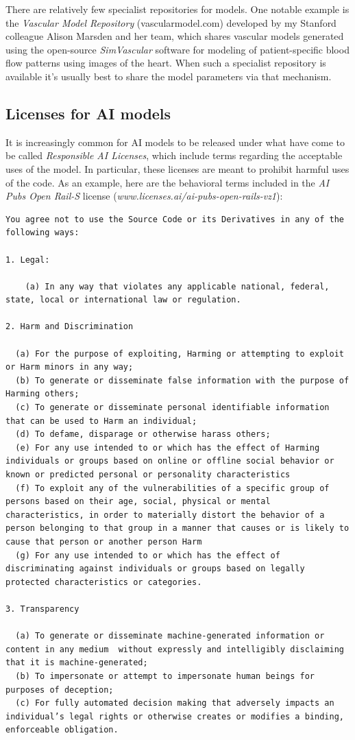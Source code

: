 There are relatively few specialist repositories for models. One notable example is the \textit{Vascular Model Repository} (vascularmodel.com) developed by my Stanford colleague Alison Marsden and her team, which shares vascular models generated using the open-source \textit{SimVascular} software for modeling of patient-specific blood flow patterns using images of the heart. When such a specialist repository is available it's usually best to share the model parameters via that mechanism.

\subsection{Licenses for AI models}

It is increasingly common for AI models to be released under what have come to be called \textit{Responsible AI Licenses}, which include terms regarding the acceptable uses of the model. In particular, these licenses are meant to prohibit harmful uses of the code. As an example, here are the behavioral terms included in the \textit{AI Pubs Open Rail-S} license (\textit{www.licenses.ai/ai-pubs-open-rails-vz1}):

\begin{lstlisting}[style=transcript]
You agree not to use the Source Code or its Derivatives in any of the following ways:

1. Legal: 

    (a) In any way that violates any applicable national, federal, state, local or international law or regulation.

2. Harm and Discrimination

  (a) For the purpose of exploiting, Harming or attempting to exploit or Harm minors in any way;
  (b) To generate or disseminate false information with the purpose of Harming others;
  (c) To generate or disseminate personal identifiable information that can be used to Harm an individual;
  (d) To defame, disparage or otherwise harass others;
  (e) For any use intended to or which has the effect of Harming individuals or groups based on online or offline social behavior or known or predicted personal or personality characteristics
  (f) To exploit any of the vulnerabilities of a specific group of persons based on their age, social, physical or mental characteristics, in order to materially distort the behavior of a person belonging to that group in a manner that causes or is likely to cause that person or another person Harm
  (g) For any use intended to or which has the effect of discriminating against individuals or groups based on legally protected characteristics or categories.

3. Transparency

  (a) To generate or disseminate machine-generated information or content in any medium  without expressly and intelligibly disclaiming that it is machine-generated;
  (b) To impersonate or attempt to impersonate human beings for purposes of deception;
  (c) For fully automated decision making that adversely impacts an individual’s legal rights or otherwise creates or modifies a binding, enforceable obligation.
\end{lstlisting}


